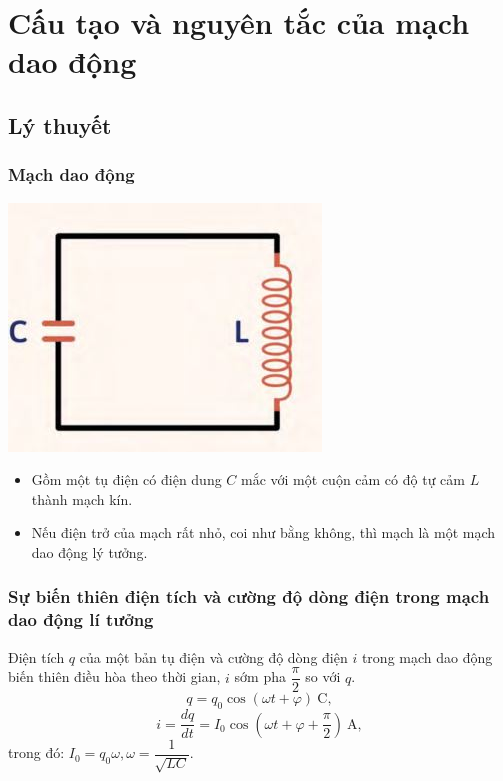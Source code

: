 \let\lesson\undefined
\newcommand{\lesson}{\phantomlesson{Bài 20: Mạch dao động}}
\chapter[Cấu tạo và nguyên tắc của mạch dao động]{Cấu tạo và nguyên tắc của mạch dao động}
\section{Lý thuyết}
\subsection {Mạch dao động}
\begin{center}
	\includegraphics[scale=0.5]{../figs/4-1-1.JPG}
\end{center}
\begin{itemize}
	\item Gồm một tụ điện có điện dung $C$ mắc với một cuộn cảm có độ tự cảm $L$ thành mạch kín.
	\item Nếu điện trở của mạch rất nhỏ, coi như bằng không, thì mạch là một mạch dao động lý tưởng.
\end{itemize}
\subsection{Sự biến thiên điện tích và cường độ dòng điện trong mạch dao động lí tưởng}
Điện tích $q$ của một bản tụ điện và cường độ dòng điện $i$ trong mạch dao động biến thiên điều hòa theo thời gian, $i$ sớm pha $\dfrac{\pi}{2} $ so với $q$.
\begin{equation}
	q=q_0\cos(\omega t +\varphi)\ \text{C}, 
\end{equation}
\begin{equation}
	i=\frac{dq}{dt}=I_0 \cos(\omega t +\varphi+ \frac{\pi}{2})\ \text{A},
\end{equation}
trong đó: $I_0=q_0\omega, \omega =\dfrac{1}{\sqrt {LC}}$.
